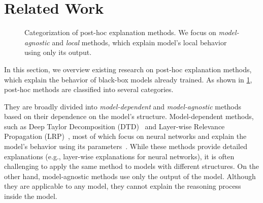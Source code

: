 \documentclass[11pt]{article}
\begin{document}
\section{Related Work}
\begin{figure}[tbp]
  \centering
  \def\w{2.5}
  \def\ww{5.0}
  \def\h{0.7}
  \def\hh{1.4}
  \def\hhh{2.1}
  \def\hhhh{2.8}
  \caption{%
    Categorization of post-hoc explanation methods.
    We focus on \emph{model-agnostic} and \emph{local} methods,
    which explain model's local behavior using only its output.
  }\label{fig:post-hoc}
\end{figure}
In this section,
we overview existing research on post-hoc explanation methods,
which explain the behavior of black-box models already trained.
As shown in \cref{fig:post-hoc},
post-hoc methods are classified into several categories.

They are broadly divided into
\emph{model-dependent} and \emph{model-agnostic} methods
based on their dependence on the model's structure.
Model-dependent methods,
such as Deep Taylor Decomposition (DTD)~\cite{montavon2017explaining}
and Layer-wise Relevance Propagation (LRP)~\cite{bach2015pixel},
most of which focus on neural networks and
explain the model's behavior using its parameters~\cite{samek2021explaining}.
While these methods provide detailed explanations
(e.g., layer-wise explanations for neural networks),
it is often challenging
to apply the same method to models with different structures.
On the other hand,
model-agnostic methods use only the output of the model.
Although they are applicable to any model,
they cannot explain the reasoning process inside the model.
\end{document}

